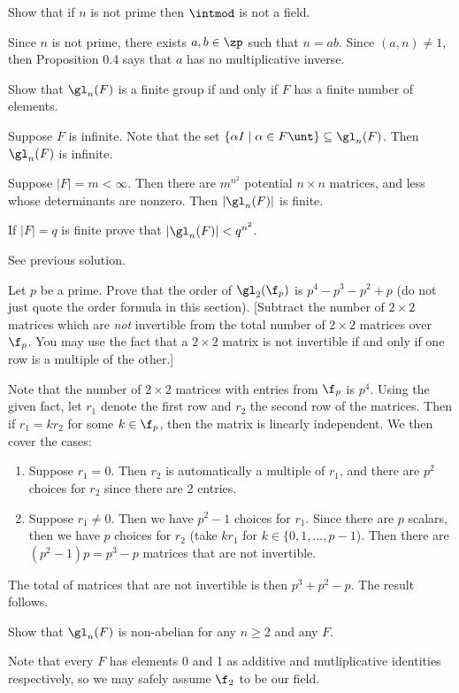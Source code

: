 \begin{problems}
\begin{sol}
    \end{sol}
    \item Show that if $n$ is not prime then $\intmod$ is not a field.
    \begin{sol}
        Since $n$ is not prime, there exists $a, b \in \zp$ such that $n = ab$. Since $(a, n) \neq 1$, then Proposition 0.4 says that $a$ has no multiplicative inverse.
    \end{sol}
    \item Show that $\gl_n(F)$ is a finite group if and only if $F$ has a finite number of elements.
    \begin{sol}
        Suppose $F$ is infinite. Note that the set $\{\alpha I \mid \alpha \in F\unt\} \subseteq \gl_n(F)$. Then $\gl_n(F)$ is infinite.
        
        Suppose $|F| = m < \infty$. Then there are $m^{n^2}$ potential $n \times n$ matrices, and less whose determinants are nonzero. Then $|\gl_n(F)|$ is finite. 
    \end{sol}
    \item If $|F| = q$ is finite prove that $|\gl_n(F)| < q^{n^2}$.
    \begin{sol}
        See previous solution.
    \end{sol}
\item Let $p$ be a prime. Prove that the order of $\gl_2(\f_p)$ is $p^4 - p^3 - p^2 + p$ (do not just quote the order formula in this section). [Subtract the number of $2 \times 2$ matrices which are \textit{not} invertible from the total number of $2 \times 2$ matrices over $\f_p$. You may use the fact that a $2 \times 2$ matrix is not invertible if and only if one row is a multiple of the other.]
    \begin{sol}
        Note that the number of $2 \times 2$ matrices with entries from $\f_p$ is $p^4$. Using the given fact, let $r_1$ denote the first row and $r_2$ the second row of the matrices. Then if $r_1 = kr_2$ for some $k \in \f_p$, then the matrix is linearly independent. We then cover the cases:
        \begin{enumerate}
            \item Suppose $r_1 = 0$. Then $r_2$ is automatically a multiple of $r_1$, and there are $p^2$ choices for $r_2$ since there are 2 entries.
            \item Suppose $r_1 \neq 0$. Then we have $p^2 - 1$ choices for $r_1$. Since there are $p$ scalars, then we have $p$ choices for $r_2$ (take $kr_1$ for $k \in \{0, 1, \ldots, p - 1$). Then there are $(p^2 - 1)p = p^3 - p$ matrices that are not invertible. 
        \end{enumerate}
        The total of matrices that are not invertible is then $p^3 + p^2 - p$. The result follows.
    \end{sol}
    \item Show that $\gl_n(F)$ is non-abelian for any $n \geq 2$ and any $F$.
    \begin{sol}
        Note that every $F$ has elements 0 and 1 as additive and mutliplicative identities respectively, so we may safely assume $\f_2$ to be our field.
        

\end{sol}
\end{problems}
